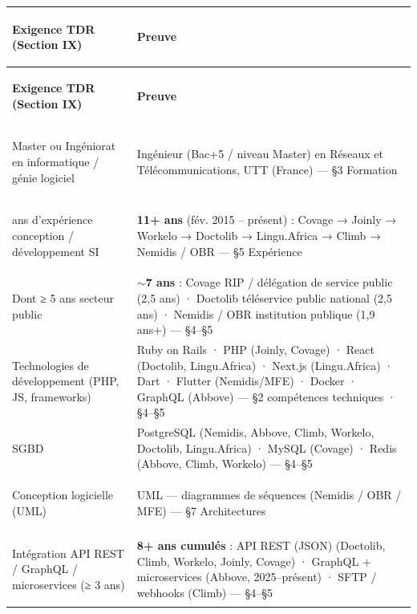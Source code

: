 
\renewcommand{\arraystretch}{1.25}
\begin{longtable}{>{\bfseries\raggedright\arraybackslash}p{6.4cm} >{\raggedright\arraybackslash}p{10.3cm}}
  \toprule
  \textbf{Exigence TDR (Section IX)} & \textbf{Preuve} \\
  \midrule
  \endfirsthead

  \toprule
  \textbf{Exigence TDR (Section IX)} & \textbf{Preuve} \\
  \midrule
  \endhead

  \bottomrule
  \endlastfoot

  Master ou Ingéniorat en informatique / génie logiciel
    & Ingénieur (Bac+5 / niveau Master) en Réseaux et Télécommunications, UTT (France) — §3 Formation \\

  10 ans d'expérience conception / développement SI
    & \textbf{11+ ans} (fév. 2015 – présent) : Covage → Joinly → Workelo → Doctolib → Lingu.Africa → Climb → Nemidis / OBR — §5 Expérience \\

  Dont ≥ 5 ans secteur public
    & \textbf{$\sim$7 ans} : Covage RIP / délégation de service public (2,5 ans) · Doctolib téléservice public national (2,5 ans) · Nemidis / OBR institution publique (1,9 ans+) — §4–§5 \\

  Technologies de développement (PHP, JS, frameworks)
    & Ruby on Rails · PHP (Joinly, Covage) · React (Doctolib, Lingu.Africa) · Next.js (Lingu.Africa) · Dart · Flutter (Nemidis/MFE) · Docker · GraphQL (Abbove) — §2 compétences techniques · §4–§5 \\

  SGBD
    & PostgreSQL (Nemidis, Abbove, Climb, Workelo, Doctolib, Lingu.Africa) · MySQL (Covage) · Redis (Abbove, Climb, Workelo) — §4–§5 \\

  Conception logicielle (UML)
    & UML — diagrammes de séquences (Nemidis / OBR / MFE) — §7 Architectures \\

  Intégration API REST / GraphQL / microservices (≥ 3 ans)
    & \textbf{8+ ans cumulés} : API REST (JSON) (Doctolib, Climb, Workelo, Joinly, Covage) · GraphQL + microservices (Abbove, 2025–présent) · SFTP / webhooks (Climb) — §4–§5 \\


\end{longtable}
